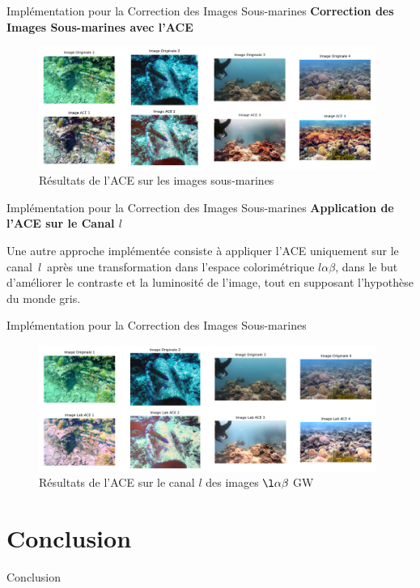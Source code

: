 \documentclass[8pt,a4paper]{beamer}
\numberwithin{figure}{section}
\begin{document}
\begin{frame}{Implémentation pour la Correction des Images Sous-marines}
\textbf{Correction des Images Sous-marines avec l'ACE}
\vspace{3mm}
\begin{figure}[h!]
\begin{center}
\includegraphics[width=11cm]{image002.png}
\end{center}
\label{figure4.3}
\caption{Résultats de l'ACE sur les images sous-marines}
\end{figure} 
\end{frame}


\begin{frame}{Implémentation pour la Correction des Images Sous-marines}
\textbf{Application de l'ACE sur le Canal \( l \)}
\vspace{3mm}
\par Une autre approche implémentée consiste à appliquer l'ACE uniquement sur le canal $\,l\,$ après une transformation dans l'espace colorimétrique $l\alpha\beta$, dans le but d'améliorer le contraste et la luminosité de l'image, tout en supposant l'hypothèse du monde gris.
\end{frame}

\begin{frame}{Implémentation pour la Correction des Images Sous-marines}
\begin{figure}[h!]
\begin{center}
\includegraphics[width=11cm]{image003.png}
\end{center}
\label{figure4.4}
\caption{Résultats de l'ACE sur le canal $l$ des images $\l\alpha\beta\;$GW}
\end{figure} 
\end{frame}

\section{Conclusion}
\begin{frame}{Conclusion}

\end{frame}
\end{document}
